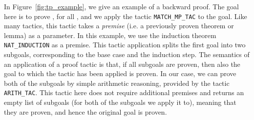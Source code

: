 \documentclass{article}
\begin{document}
In Figure~\ref{fig:tp_example}, we give an example of a backward proof.
The goal here is to prove , for all , and we apply the tactic \texttt{MATCH\_MP\_TAC} to the goal.
Like many tactics, this tactic takes a \emph{premise} (i.e. a previously proven theorem or lemma) as a parameter.
In this example, we use the induction theorem \texttt{NAT\_INDUCTION} as a premise.
This tactic application splits the first goal into two subgoals, corresponding to the base case and the induction step.
The semantics of an application of a proof tactic is that, if all subgoals are proven, then also the goal to which the tactic has been applied is proven.
In our case, we can prove both of the subgoals by simple arithmetic reasoning, provided by the tactic \texttt{ARITH\_TAC}.
This tactic here does not require additional premises and returns an empty list of subgoals (for both of the subgoals we apply it to), meaning that they are proven, and hence the original goal is proven.
\end{document}
